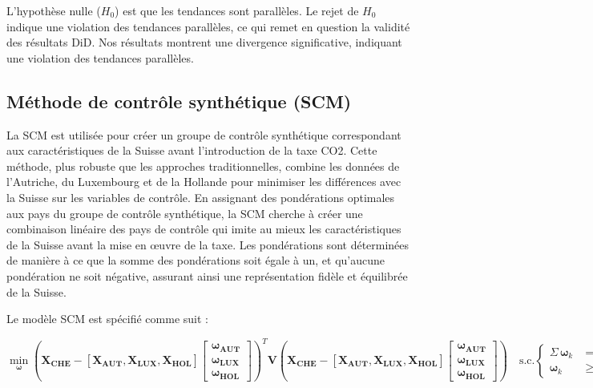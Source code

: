 L'hypothèse nulle ($H_0$) est que les tendances sont parallèles. Le rejet de $H_0$ indique une violation des tendances parallèles, ce qui remet en question la validité des résultats DiD. Nos résultats montrent une divergence significative, indiquant une violation des tendances parallèles.


\subsection{Méthode de contrôle synthétique (SCM)}
\label{subsec:strategie_scm_method}


La SCM est utilisée pour créer un groupe de contrôle synthétique correspondant aux caractéristiques de la Suisse avant l'introduction de la taxe CO2. Cette méthode, plus robuste que les approches traditionnelles, combine les données de l'Autriche, du Luxembourg et de la Hollande pour minimiser les différences avec la Suisse sur les variables de contrôle. En assignant des pondérations optimales aux pays du groupe de contrôle synthétique, la SCM cherche à créer une combinaison linéaire des pays de contrôle qui imite au mieux les caractéristiques de la Suisse avant la mise en œuvre de la taxe. Les pondérations sont déterminées de manière à ce que la somme des pondérations soit égale à un, et qu'aucune pondération ne soit négative, assurant ainsi une représentation fidèle et équilibrée de la Suisse.


Le modèle SCM est spécifié comme suit :

$$
\min_{\mathbf{\boldsymbol{\omega}}} \left( \mathbf{X}_{\mathbf{CHE}} - \left[ \mathbf{X}_{\mathbf{AUT}}, \mathbf{X}_{\mathbf{LUX}}, \mathbf{X}_{\mathbf{HOL}} \right]\begin{bmatrix} \boldsymbol{\omega}_{\mathbf{AUT}} \\ \boldsymbol{\omega}_{\mathbf{LUX}} \\ \boldsymbol{\omega}_{\mathbf{HOL}} \end{bmatrix} \right)^T \mathbf{V} \left( \mathbf{X}_{\mathbf{CHE}} - \left[ \mathbf{X}_{\mathbf{AUT}}, \mathbf{X}_{\mathbf{LUX}}, \mathbf{X}_{\mathbf{HOL}} \right] \begin{bmatrix} \boldsymbol{\omega}_{\mathbf{AUT}} \\ \boldsymbol{\omega}_{\mathbf{LUX}} \\ \boldsymbol{\omega}_{\mathbf{HOL}} \end{bmatrix} \right)
\quad \text{s.c.} \begin{cases}
\Sigma \, \boldsymbol{\omega}_k & = 1 \\
\boldsymbol{\omega}_k & \geq 0 
\end{cases}
$$


